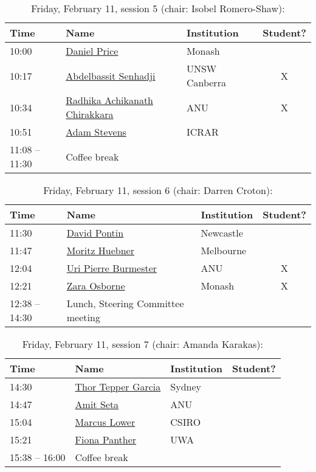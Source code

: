 \documentclass[amsmath,onecolumn]{revtex4-1}
\begin{document}
\begin{table}[!htbp]
	\centering
	\caption{Friday, February 11, session 5 (chair: Isobel Romero-Shaw):}
\begin{tabular}{| l | l | l | c |}
	\hline
	Time & Name  & Institution & Student? \\ 		
	\hline
	10:00 & \href{https://forms.gle/ZM8HoYqw1VRShzLNA}{Daniel Price} & Monash &  \\	
	10:17 & \href{https://forms.gle/ZM8HoYqw1VRShzLNA}{Abdelbassit	Senhadji} & UNSW Canberra & X \\
	10:34 & \href{https://forms.gle/ZM8HoYqw1VRShzLNA}{Radhika Achikanath Chirakkara} & ANU & X \\
	10:51 & \href{https://forms.gle/ZM8HoYqw1VRShzLNA}{Adam Stevens} & ICRAR &  \\
	11:08 -- 11:30 & Coffee break & & \\
	\hline
\end{tabular}
\end{table}


\begin{table}[!htbp]
	\centering
	\caption{Friday, February 11, session 6 (chair: Darren Croton):}
\begin{tabular}{| l | l | l | c |}
	\hline
	Time & Name  & Institution & Student? \\ 		
	\hline
	11:30 & \href{https://forms.gle/ZM8HoYqw1VRShzLNA}{David	Pontin} & Newcastle &  \\
	11:47 & \href{https://forms.gle/ZM8HoYqw1VRShzLNA}{Moritz	Huebner} & Melbourne &  \\
	12:04 & \href{https://forms.gle/ZM8HoYqw1VRShzLNA}{Uri Pierre Burmester} &  ANU & X \\
	12:21 & \href{https://forms.gle/ZM8HoYqw1VRShzLNA}{Zara Osborne} & Monash & X \\
	12:38 -- 14:30 & Lunch, Steering Committee meeting & & \\
	\hline
\end{tabular}
\end{table}	

\begin{table}[!htbp]
	\centering
	\caption{Friday, February 11, session 7 (chair: Amanda Karakas):}
\begin{tabular}{| l | l | l | c |}
	\hline
	Time & Name  & Institution & Student? \\ 		
	\hline
	14:30 & \href{https://forms.gle/ZM8HoYqw1VRShzLNA}{Thor Tepper Garcia} & Sydney &  \\
	14:47 & \href{https://forms.gle/ZM8HoYqw1VRShzLNA}{Amit Seta} & ANU &  \\
	15:04 & \href{https://forms.gle/ZM8HoYqw1VRShzLNA}{Marcus Lower} & CSIRO & \\
	15:21 & \href{https://forms.gle/ZM8HoYqw1VRShzLNA}{Fiona	Panther} & UWA &  \\
	15:38 -- 16:00 & Coffee break & & \\
	\hline
\end{tabular}
\end{table}
\end{document}
